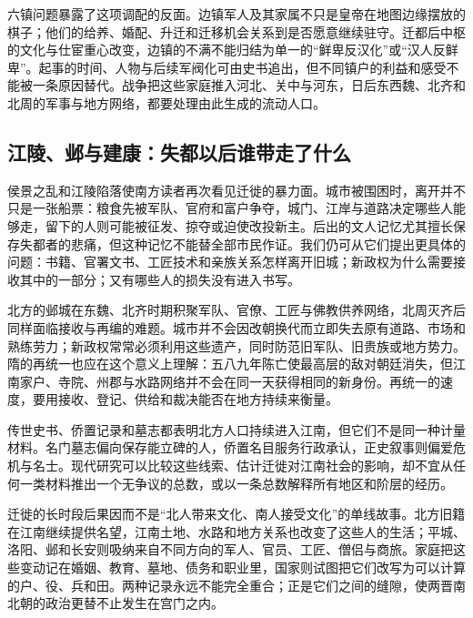 六镇问题暴露了这项调配的反面。边镇军人及其家属不只是皇帝在地图边缘摆放的棋子；他们的给养、婚配、升迁和迁移机会关系到是否愿意继续驻守。迁都后中枢的文化与仕宦重心改变，边镇的不满不能归结为单一的“鲜卑反汉化”或“汉人反鲜卑”。起事的时间、人物与后续军阀化可由史书追出，但不同镇户的利益和感受不能被一条原因替代。战争把这些家庭推入河北、关中与河东，日后东西魏、北齐和北周的军事与地方网络，都要处理由此生成的流动人口。

\subsection{江陵、邺与建康：失都以后谁带走了什么}

侯景之乱和江陵陷落使南方读者再次看见迁徙的暴力面。城市被围困时，离开并不只是一张船票：粮食先被军队、官府和富户争夺，城门、江岸与道路决定哪些人能够走，留下的人则可能被征发、掠夺或迫使改投新主。后出的文人记忆尤其擅长保存失都者的悲痛，但这种记忆不能替全部市民作证。我们仍可从它们提出更具体的问题：书籍、官署文书、工匠技术和亲族关系怎样离开旧城；新政权为什么需要接收其中的一部分；又有哪些人的损失没有进入书写。

北方的邺城在东魏、北齐时期积聚军队、官僚、工匠与佛教供养网络，北周灭齐后同样面临接收与再编的难题。城市并不会因改朝换代而立即失去原有道路、市场和熟练劳力；新政权常常必须利用这些遗产，同时防范旧军队、旧贵族或地方势力。隋的再统一也应在这个意义上理解：五八九年陈亡使最高层的敌对朝廷消失，但江南家户、寺院、州郡与水路网络并不会在同一天获得相同的新身份。再统一的速度，要用接收、登记、供给和裁决能否在地方持续来衡量。

\begin{debate}[南渡人数能算出来吗]
传世史书、侨置记录和墓志都表明北方人口持续进入江南，但它们不是同一种计量材料。名门墓志偏向保存能立碑的人，侨置名目服务行政承认，正史叙事则偏爱危机与名士。现代研究可以比较这些线索、估计迁徙对江南社会的影响，却不宜从任何一类材料推出一个无争议的总数，或以一条总数解释所有地区和阶层的经历。
\end{debate}

迁徙的长时段后果因而不是“北人带来文化、南人接受文化”的单线故事。北方旧籍在江南继续提供名望，江南土地、水路和地方关系也改变了这些人的生活；平城、洛阳、邺和长安则吸纳来自不同方向的军人、官员、工匠、僧侣与商旅。家庭把这些变动记在婚姻、教育、墓地、债务和职业里，国家则试图把它们改写为可以计算的户、役、兵和田。两种记录永远不能完全重合；正是它们之间的缝隙，使两晋南北朝的政治更替不止发生在宫门之内。
